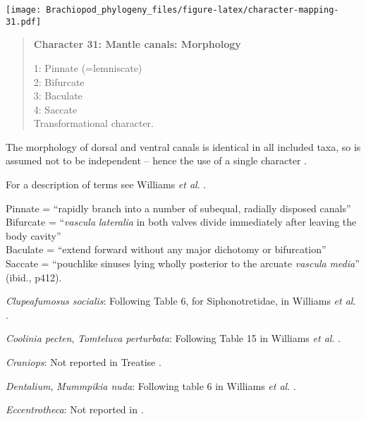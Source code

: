 \documentclass[openany]{book}
\theoremstyle{definition}
\theoremstyle{definition}
\theoremstyle{definition}
\theoremstyle{remark}
\begin{document}
\texttt{[image: Brachiopod\_phylogeny\_files/figure-latex/character-mapping-31.pdf]}

\begin{quote}
\textbf{Character 31: Mantle canals: Morphology}

1: Pinnate (=lemniscate)\\
2: Bifurcate\\
3: Baculate\\
4: Saccate\\
Transformational character.
\end{quote}

The morphology of dorsal and ventral canals is identical in all included
taxa, so is assumed not to be independent -- hence the use of a single
character \citep[contra][]{Williams2000LinguliformeaCraniiformea}.

For a description of terms see Williams \emph{et al}.
\citeyearpar[2000]{Williams1997Introduction}.

Pinnate = ``rapidly branch into a number of subequal, radially disposed
canals''\\
Bifurcate = ``\emph{vascula} \emph{lateralia} in both valves divide
immediately after leaving the body cavity''\\
Baculate = ``extend forward without any major dichotomy or bifurcation''
\citep[ p.~418]{Williams1997Introduction}\\
Saccate = ``pouchlike sinuses lying wholly posterior to the arcuate
\emph{vascula} \emph{media}'' (ibid., p412).

\hypertarget{Clupeafumosus_socialis-coding-31}{}
\emph{Clupeafumosus socialis}: Following Table 6, for Siphonotretidae,
in Williams \emph{et al}.
\citeyearpar{Williams2000LinguliformeaCraniiformea}.

\hypertarget{Coolinia_pecten-coding-31}{}
\emph{Coolinia pecten}, \emph{Tomteluva perturbata}: Following Table 15
in Williams \emph{et al}.
\citeyearpar{Williams2000LinguliformeaCraniiformea}.

\hypertarget{Craniops-coding-31}{}
\emph{Craniops}: Not reported in Treatise
\citep{Williams2000LinguliformeaCraniiformea}.

\hypertarget{Dentalium-coding-31}{}
\emph{Dentalium}, \emph{Mummpikia nuda}: Following table 6 in Williams
\emph{et al}. \citeyearpar{Williams2000LinguliformeaCraniiformea}.

\hypertarget{Eccentrotheca-coding-31}{}
\emph{Eccentrotheca}: Not reported in
\citet{Williams2000LinguliformeaCraniiformea}.
\end{document}
